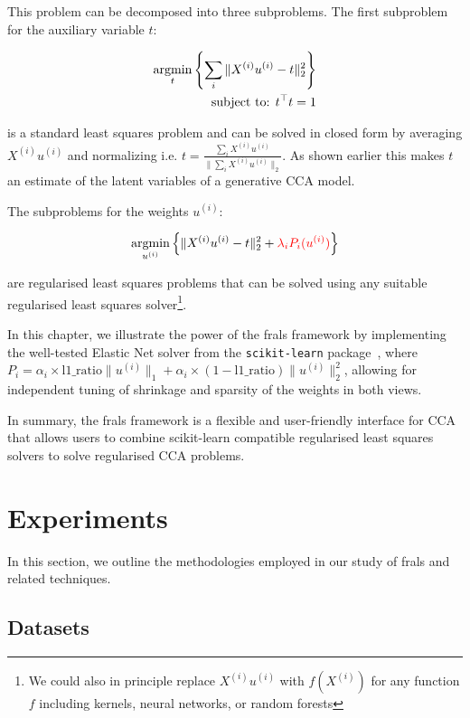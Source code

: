 This problem can be decomposed into three subproblems.
The first subproblem for the auxiliary variable \(t\):

\begin{align}
    \underset{t}{\mathrm{argmin}}\left\{\sum_i \|X^{(i)} u^{(i)} - t\|_2^2\right\}\\
    \text{subject to: }t^\top t = 1 \notag
\end{align}

is a standard least squares problem and can be solved in closed form by averaging \(X^{(i)} u^{(i)}\) and normalizing i.e. \(t = \frac{\sum_i X^{(i)} u^{(i)}}{\|\sum_i X^{(i)} u^{(i)}\|_2}\).
As shown earlier this makes \(t\) an estimate of the latent variables of a generative CCA model.

The subproblems for the weights \(u^{(i)}\):

\begin{align}
    \underset{u^{(i)}}{\mathrm{argmin}}\left\{\|X^{(i)} u^{(i)} - t\|_2^2 + \textcolor{red}{\lambda_i P_i(u^{(i)})} \right\}
\end{align}

are regularised least squares problems that can be solved using any suitable regularised least squares solver\footnote{We could also in principle replace $X^{(i)} u^{(i)}$ with $f(X^{(i)})$ for any function $f$ including kernels, neural networks, or random forests}.

In this chapter, we illustrate the power of the \acrshort{frals} framework by implementing the well-tested Elastic Net solver from the \texttt{scikit-learn} package~\citep{pedregosa2011scikit}, where \(P_i = \alpha_i \times \text{l1\_ratio} \|u^{(i)}\|_1 + \alpha_i \times (1-\text{l1\_ratio}) \|u^{(i)}\|_2^2\), allowing for independent tuning of shrinkage and sparsity of the weights in both views.

In summary, the \acrshort{frals} framework is a flexible and user-friendly interface for CCA that allows users to combine scikit-learn compatible regularised least squares solvers to solve regularised CCA problems.


\section{Experiments}

In this section, we outline the methodologies employed in our study of \acrshort{frals} and related techniques.

\subsection{Datasets}\label{subsec:datasets}


